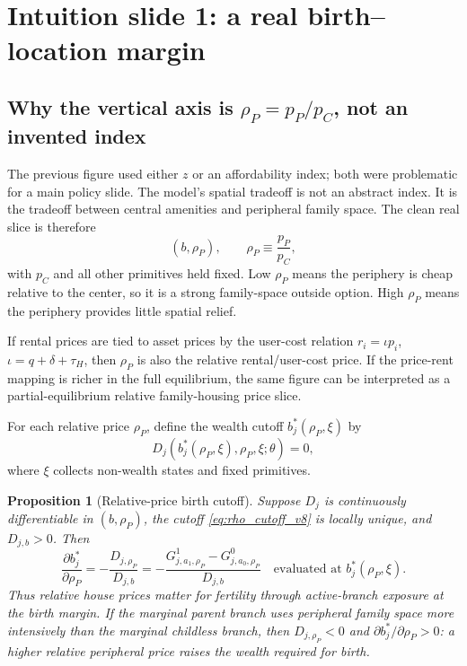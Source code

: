 \documentclass[11pt]{article}
\newcommand{\gap}{D}
\newcommand{\rhoP}{\rho_P}
\newtheorem{proposition}{Proposition}
\theoremstyle{remark}
\begin{document}
\section{Intuition slide 1: a real birth--location margin}

\subsection*{Why the vertical axis is \(\rhoP=p_P/p_C\), not an invented index}

The previous figure used either \(z\) or an affordability index; both were problematic for a main policy slide.  The model's spatial tradeoff is not an abstract index.  It is the tradeoff between central amenities and peripheral family space.  The clean real slice is therefore
\begin{equation}
  (b,\rhoP), \qquad \rhoP\equiv \frac{p_P}{p_C},
\end{equation}
with \(p_C\) and all other primitives held fixed.  Low \(\rhoP\) means the periphery is cheap relative to the center, so it is a strong family-space outside option.  High \(\rhoP\) means the periphery provides little spatial relief.

If rental prices are tied to asset prices by the user-cost relation \(r_i=\iota p_i\), \(\iota=q+\delta+\tau_H\), then \(\rhoP\) is also the relative rental/user-cost price.  If the price-rent mapping is richer in the full equilibrium, the same figure can be interpreted as a partial-equilibrium relative family-housing price slice.

For each relative price \(\rhoP\), define the wealth cutoff \(b_j^*(\rhoP,\xi)\) by
\begin{equation}
  \gap_j(b_j^*(\rhoP,\xi),\rhoP,\xi;\theta)=0,
  \label{eq:rho_cutoff_v8}
\end{equation}
where \(\xi\) collects non-wealth states and fixed primitives.

\begin{proposition}[Relative-price birth cutoff]
Suppose \(\gap_j\) is continuously differentiable in \((b,\rhoP)\), the cutoff \eqref{eq:rho_cutoff_v8} is locally unique, and \(\gap_{j,b}>0\).  Then
\begin{equation}
  \frac{\partial b_j^*}{\partial \rhoP}
  =-
  \frac{\gap_{j,\rhoP}}{\gap_{j,b}}
  =-
  \frac{G^1_{j,a_1,\rhoP}-G^0_{j,a_0,\rhoP}}{\gap_{j,b}}
  \quad\text{evaluated at } b_j^*(\rhoP,\xi).
  \label{eq:rho_slope_v8}
\end{equation}
Thus relative house prices matter for fertility through active-branch exposure at the birth margin.  If the marginal parent branch uses peripheral family space more intensively than the marginal childless branch, then \(\gap_{j,\rhoP}<0\) and \(\partial b_j^*/\partial\rhoP>0\): a higher relative peripheral price raises the wealth required for birth.
\end{proposition}
\end{document}
